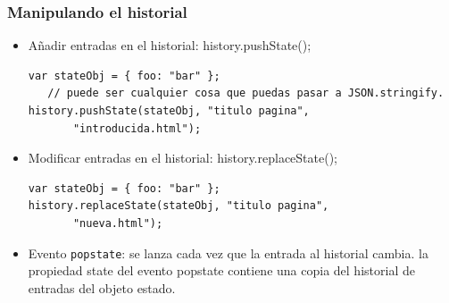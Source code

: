 \begin{frame}[fragile]
\frametitle{Manipulando el historial}


\begin{itemize}
  \item Añadir entradas en el historial: history.pushState();
\begin{verbatim}
var stateObj = { foo: "bar" };  
   // puede ser cualquier cosa que puedas pasar a JSON.stringify.
history.pushState(stateObj, "titulo pagina", 
       "introducida.html");
\end{verbatim}
  \item Modificar entradas en el historial: history.replaceState();
\begin{verbatim}
var stateObj = { foo: "bar" };
history.replaceState(stateObj, "titulo pagina", 
       "nueva.html");
\end{verbatim}
  \item Evento \texttt{popstate}: se lanza cada vez que la entrada al historial cambia.  la propiedad state del evento popstate contiene una copia del historial de entradas del objeto estado.
\end{itemize}

\end{frame}











